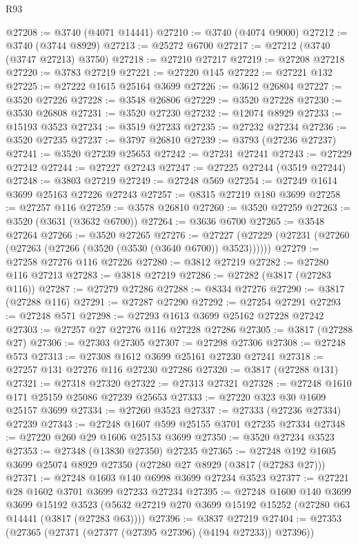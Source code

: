 \begin{lexlean}{R93}
\begin{coremodule}
@27208 := @3740 (@4071 @14441)
@27210 := @3740 (@4074 @9000)
@27212 := @3740 (@3744 @8929)
@27213 := @25272 @6700
@27217 := @27212 (@3740 (@3747 @27213) @3750)
@27218 := @27210 @27217
@27219 := @27208 @27218
@27220 := @3783 @27219
@27221 := @27220 @145
@27222 := @27221 @132
@27225 := @27222 @1615 @25164 @3699
@27226 := @3612 @26804
@27227 := @3520 @27226
@27228 := @3548 @26806
@27229 := @3520 @27228
@27230 := @3530 @26808
@27231 := @3520 @27230
@27232 := @12074 @8929
@27233 := @15193 @3523
@27234 := @3519 @27233
@27235 := @27232 @27234
@27236 := @3520 @27235
@27237 := @3797 @26810
@27239 := @3793 (@27236 @27237)
@27241 := @3520 @27239 @25653
@27242 := @27231 @27241
@27243 := @27229 @27242
@27244 := @27227 @27243
@27247 := @27225 @27244 (@3519 @27244)
@27248 := @3803 @27219
@27249 := @27248 @569
@27254 := @27249 @1614 @3699 @25163 @27226 @27243
@27257 := @8315 @27219 @180 @3699
@27258 := @27257 @116
@27259 := @3578 @26810
@27260 := @3520 @27259
@27263 := @3520 (@3631 (@3632 @6700))
@27264 := @3636 @6700
@27265 := @3548 @27264
@27266 := @3520 @27265
@27276 := @27227 (@27229 (@27231 (@27260 (@27263 (@27266 (@3520 (@3530 (@3640 @6700)) @3523))))))
@27279 := @27258 @27276 @116 @27226
@27280 := @3812 @27219
@27282 := @27280 @116 @27213
@27283 := @3818 @27219
@27286 := @27282 (@3817 (@27283 @116))
@27287 := @27279 @27286
@27288 := @8334 @27276
@27290 := @3817 (@27288 @116)
@27291 := @27287 @27290
@27292 := @27254 @27291
@27293 := @27248 @571
@27298 := @27293 @1613 @3699 @25162 @27228 @27242
@27303 := @27257 @27 @27276 @116 @27228 @27286
@27305 := @3817 (@27288 @27)
@27306 := @27303 @27305
@27307 := @27298 @27306
@27308 := @27248 @573
@27313 := @27308 @1612 @3699 @25161 @27230 @27241
@27318 := @27257 @131 @27276 @116 @27230 @27286
@27320 := @3817 (@27288 @131)
@27321 := @27318 @27320
@27322 := @27313 @27321
@27328 := @27248 @1610 @171 @25159 @25086 @27239 @25653
@27333 := @27220 @323 @30 @1609 @25157 @3699
@27334 := @27260 @3523
@27337 := @27333 (@27236 @27334) @27239
@27343 := @27248 @1607 @599 @25155 @3701 @27235 @27334
@27348 := @27220 @260 @29 @1606 @25153 @3699
@27350 := @3520 @27234 @3523
@27353 := @27348 (@13830 @27350) @27235
@27365 := @27248 @192 @1605 @3699 @25074 @8929 @27350 (@27280 @27 @8929 (@3817 (@27283 @27)))
@27371 := @27248 @1603 @140 @6998 @3699 @27234 @3523
@27377 := @27221 @28 @1602 @3701 @3699 @27233 @27234
@27395 := @27248
    @1600
    @140
    @3699
    @3699
    @15192
    @3523
    (@5632 @27219 @270 @3699 @15192 @15252 (@27280 @63 @14441 (@3817 (@27283 @63))))
@27396 := @3837 @27219
@27404 := @27353 (@27365 (@27371 (@27377 (@27395 @27396) (@4194 @27233)) @27396))

\end{coremodule}
\end{lexlean}
